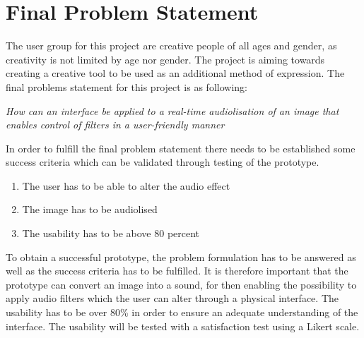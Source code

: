 \chapter{Final Problem Statement}\label{ch:finalproblem}

The user group for this project are creative people of all ages and gender, as creativity is not limited by age nor gender. The project is aiming towards creating a creative tool to be used as an additional method of expression. 
The final problems statement for this project is as following:


\textit{How can an interface be applied to a real-time audiolisation of an image that enables control of filters in a user-friendly manner}


In order to fulfill the final problem statement there needs to be established some success criteria which can be validated through testing of the prototype. 
\begin{enumerate}
\item The user has to be able to alter the audio effect
\item The image has to be audiolised 
\item The usability has to be above 80 percent
\end{enumerate}

To obtain a successful prototype, the problem formulation has to be answered as well as the success criteria has to be fulfilled. It is therefore important that the prototype can convert an image into a sound, for then enabling the possibility to apply audio filters which the user can alter through a physical interface. The usability has to be over 80\% in order to ensure an adequate understanding of the interface. The usability will be tested with a satisfaction test using a Likert scale.